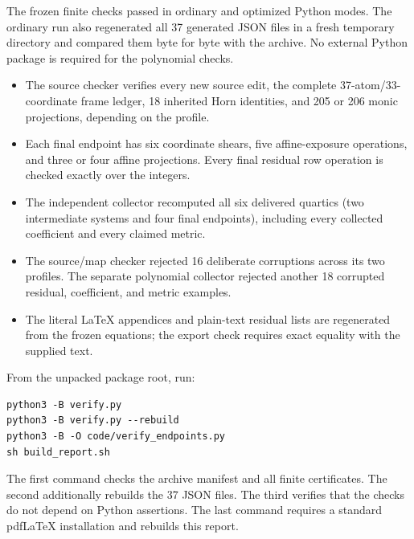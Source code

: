 The frozen finite checks passed in ordinary and optimized Python modes.
The ordinary run also regenerated all 37 generated JSON files in a fresh
temporary directory and compared them byte for byte with the archive.
No external Python package is required for the polynomial checks.

\begin{itemize}[leftmargin=*]
\item The source checker verifies every new source edit, the complete
      37-atom/33-coordinate frame ledger, 18 inherited Horn identities,
      and 205 or 206 monic projections, depending on the profile.
\item Each final endpoint has six coordinate shears, five affine-exposure
      operations, and three or four affine projections. Every final
      residual row operation is checked exactly over the integers.
\item The independent collector recomputed all six delivered quartics
      (two intermediate systems and four final endpoints), including
      every collected coefficient and every claimed metric.
\item The source/map checker rejected 16 deliberate corruptions across
      its two profiles. The separate polynomial collector rejected
      another 18 corrupted residual, coefficient, and metric examples.
\item The literal LaTeX appendices and plain-text residual lists are
      regenerated from the frozen equations; the export check requires
      exact equality with the supplied text.
\end{itemize}

From the unpacked package root, run:
\begin{verbatim}
python3 -B verify.py
python3 -B verify.py --rebuild
python3 -B -O code/verify_endpoints.py
sh build_report.sh
\end{verbatim}
The first command checks the archive manifest and all finite certificates.
The second additionally rebuilds the 37 JSON files. The third verifies
that the checks do not depend on Python assertions. The last command
requires a standard pdfLaTeX installation and rebuilds this report.
